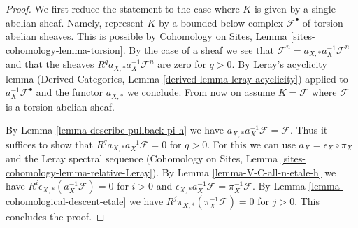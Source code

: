 \documentclass[10pt,a4paper]{amsart}
\theoremstyle{plain}
\theoremstyle{definition}
\theoremstyle{remark}
\numberwithin{equation}{subsection}
\begin{document}
\begin{proof}
We first reduce the statement to the case where
$K$ is given by a single abelian sheaf. Namely, represent $K$
by a bounded below complex $\mathcal{F}^\bullet$ of torsion
abelian sheaves. This is possible by Cohomology on Sites, Lemma
\ref{sites-cohomology-lemma-torsion}. By the case of a
sheaf we see that
$\mathcal{F}^n = a_{X, *} a_X^{-1} \mathcal{F}^n$
and that the sheaves $R^qa_{X, *}a_X^{-1}\mathcal{F}^n$
are zero for $q > 0$. By Leray's acyclicity lemma
(Derived Categories, Lemma \ref{derived-lemma-leray-acyclicity})
applied to $a_X^{-1}\mathcal{F}^\bullet$
and the functor $a_{X, *}$ we conclude. From now on assume $K = \mathcal{F}$
where $\mathcal{F}$ is a torsion abelian sheaf.

\medskip\noindent
By Lemma \ref{lemma-describe-pullback-pi-h} we have
$a_{X, *}a_X^{-1}\mathcal{F} = \mathcal{F}$. Thus it suffices to show that
$R^qa_{X, *}a_X^{-1}\mathcal{F} = 0$ for $q > 0$.
For this we can use $a_X = \epsilon_X \circ \pi_X$ and
the Leray spectral sequence
(Cohomology on Sites, Lemma \ref{sites-cohomology-lemma-relative-Leray}).
By Lemma \ref{lemma-V-C-all-n-etale-h}
we have $R^i\epsilon_{X, *}(a_X^{-1}\mathcal{F}) = 0$ for $i > 0$
and $\epsilon_{X, *}a_X^{-1}\mathcal{F} = \pi_X^{-1}\mathcal{F}$.
By Lemma \ref{lemma-cohomological-descent-etale} we have
$R^j\pi_{X, *}(\pi_X^{-1}\mathcal{F}) = 0$ for $j > 0$.
This concludes the proof.
\end{proof}
\end{document}
